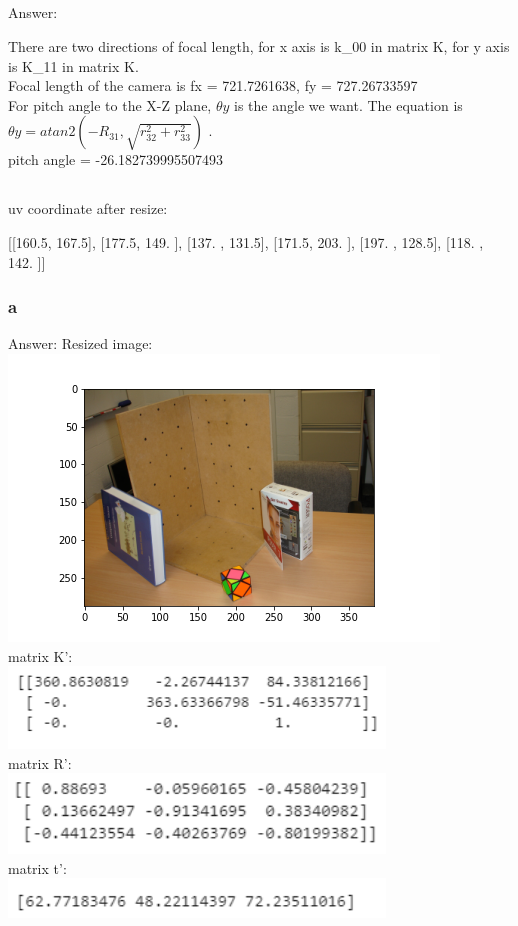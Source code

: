 \documentclass[]{article}
\begin{document}
\subsection{}
Answer: 

There are two directions of focal length, for x axis is k\_00 in matrix K, for y axis is K\_11 in matrix K.\\
Focal length of the camera is fx = 721.7261638, fy = 727.26733597\\

For pitch angle to the X-Z plane, $\theta y$ is the angle we want. The equation is $\theta y = atan2(-R_{31}, \sqrt{r^2_{32} + r^2_{33} } )$ .\\
pitch angle = -26.182739995507493

\subsection{}
uv coordinate after resize:

[[160.5, 167.5], [177.5, 149. ], [137. , 131.5], [171.5, 203. ], [197. , 128.5], [118. , 142. ]]

\subsubsection{a}
Answer: Resized image:\\

\includegraphics[width=10CM]{shrink.png}\\
matrix K': \\
\includegraphics[width=10cm]{k2.png}\\
matrix R': \\
\includegraphics[width=10cm]{r2.png}\\
matrix t': \\
\includegraphics[width=10cm]{t2.png}
\end{document}
